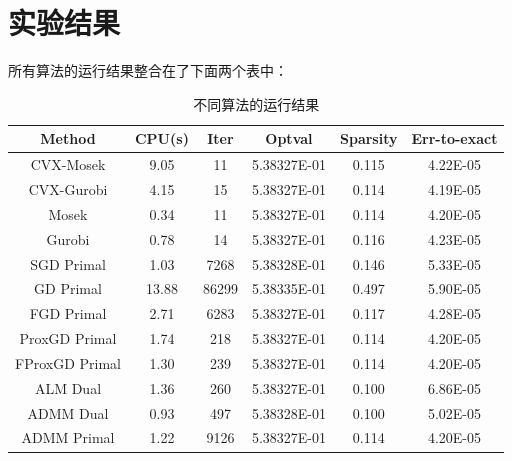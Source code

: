 \documentclass[a4paper,12pt]{ctexart}
\begin{document}
	\section{实验结果}
	所有算法的运行结果整合在了下面两个表中：
		\begin{table}[h!]
			\begin{center}
				\caption{不同算法的运行结果}
				\label{table.1}
				\begin{tabular}{c|c|c|c|c|c}
					\textbf{Method} & \textbf{CPU(s)} & \textbf{Iter} & \textbf{Optval} & \textbf{Sparsity} & \textbf{Err-to-exact} \\
					\hline
					CVX-Mosek & 9.05 & 11 & 5.38327E-01 & 0.115 &  4.22E-05 \\
					CVX-Gurobi & 4.15 & 15 & 5.38327E-01 & 0.114 &  4.19E-05 \\
					Mosek & 0.34 & 11 & 5.38327E-01 & 0.114 & 4.20E-05 \\
					Gurobi & 0.78 & 14 & 5.38327E-01 & 0.116 & 4.23E-05 \\
					SGD Primal & 1.03 & 7268 & 5.38328E-01 & 0.146 & 5.33E-05 \\
					GD Primal & 13.88 & 86299 & 5.38335E-01 & 0.497 & 5.90E-05 \\
					FGD Primal & 2.71 & 6283 & 5.38327E-01 & 0.117 & 4.28E-05 \\
					ProxGD Primal & 1.74 & 218 & 5.38327E-01 & 0.114 & 4.20E-05 \\
					FProxGD Primal & 1.30 & 239 & 5.38327E-01 & 0.114 & 4.20E-05 \\
					ALM Dual & 1.36 & 260 & 5.38327E-01 & 0.100 & 6.86E-05 \\
					ADMM Dual & 0.93 & 497 & 5.38328E-01 & 0.100 & 5.02E-05 \\
					ADMM Primal & 1.22 & 9126 & 5.38327E-01 & 0.114 & 4.20E-05 \\			
				\end{tabular}
			\end{center}
		\end{table}
\end{document}

